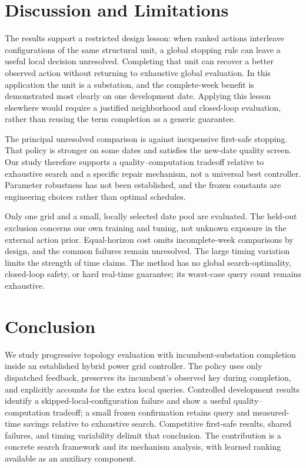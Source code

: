 \documentclass[letterpaper]{article}
\begin{document}
\section{Discussion and Limitations}

The results support a restricted design lesson: when ranked actions interleave configurations of the same structural unit, a global stopping rule can leave a useful local decision unresolved. Completing that unit can recover a better observed action without returning to exhaustive global evaluation. In this application the unit is a substation, and the complete-week benefit is demonstrated most clearly on one development date. Applying this lesson elsewhere would require a justified neighborhood and closed-loop evaluation, rather than reusing the term completion as a generic guarantee.


The principal unresolved comparison is against inexpensive first-safe stopping. That policy is stronger on some dates and satisfies the new-date quality screen. Our study therefore supports a quality--computation tradeoff relative to exhaustive search and a specific repair mechanism, not a universal best controller. Parameter robustness has not been established, and the frozen constants are engineering choices rather than optimal schedules.


Only one grid and a small, locally selected date pool are evaluated. The held-out exclusion concerns our own training and tuning, not unknown exposure in the external action prior. Equal-horizon cost omits incomplete-week comparisons by design, and the common failures remain unresolved. The large timing variation limits the strength of time claims. The method has no global search-optimality, closed-loop safety, or hard real-time guarantee; its worst-case query count remains exhaustive.


\section{Conclusion}

We study progressive topology evaluation with incumbent-substation completion inside an established hybrid power grid controller. The policy uses only dispatched feedback, preserves its incumbent's observed key during completion, and explicitly accounts for the extra local queries. Controlled development results identify a skipped-local-configuration failure and show a useful quality--computation tradeoff; a small frozen confirmation retains query and measured-time savings relative to exhaustive search. Competitive first-safe results, shared failures, and timing variability delimit that conclusion. The contribution is a concrete search framework and its mechanism analysis, with learned ranking available as an auxiliary component.
\end{document}

